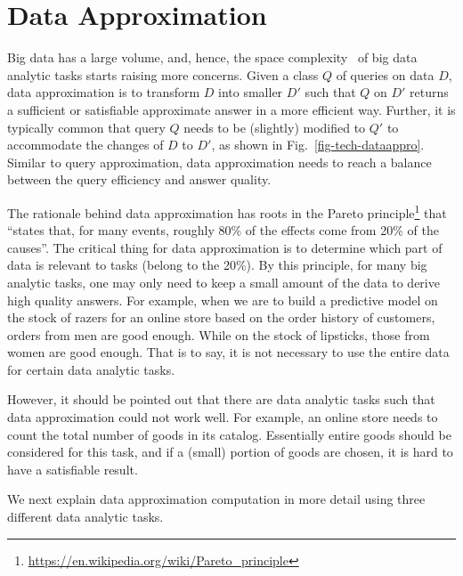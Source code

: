 \section{Data Approximation}
\label{sec-data}






Big data has a large volume, and, hence, the space complexity~\cite{CormenLRS01} of big data analytic tasks starts raising more concerns.
Given a class $Q$ of queries on data $D$, data approximation is to transform $D$ into smaller $D'$ such that $Q$ on $D'$ returns a sufficient or satisfiable approximate answer in a more efficient way. Further, it is typically common that query $Q$ needs to be (slightly) modified to $Q'$ to accommodate  the changes of $D$ to $D'$, as shown in Fig.~\ref{fig-tech-dataappro}. Similar to query approximation, data approximation needs to reach a balance between the query efficiency and answer quality.


The rationale behind data approximation has roots in the Pareto principle\footnote{\small \url{https://en.wikipedia.org/wiki/Pareto_principle}} that ``states that, for many events, roughly 80\% of the effects come from 20\% of the causes''. The critical thing for data approximation is to determine which part of data is relevant to tasks (belong to the 20\%).
 By this principle, for many big analytic tasks, one may only need to keep a small amount of the data to derive high quality answers.
For example, when we are to build a predictive model on the stock of razers for an online store based on the order history of customers, orders from men are good enough. While on the stock of lipsticks, those from women are good enough. That is to say,  it is not necessary to use the entire data for certain data analytic tasks.



However, it should be pointed out that there are data analytic tasks such that data approximation could not work well. For example, an online store needs to count the total number of goods in its catalog.  Essentially entire goods should be considered for this task, and if a (small) portion of goods are chosen, it is hard to have a satisfiable result.


We next explain data approximation computation in more detail using three different data analytic tasks.



